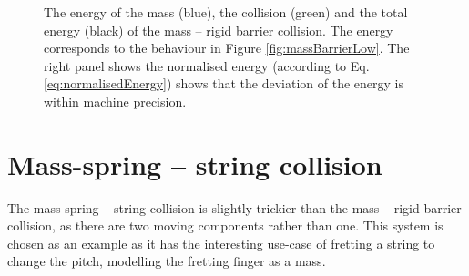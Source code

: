 \begin{figure}[h]
    \centering
      \caption{The energy of the mass (blue), the collision (green) and the total energy (black) of the mass -- rigid barrier collision. The energy corresponds to the behaviour in Figure \ref{fig:massBarrierLow}. The right panel shows the normalised energy (according to Eq. \eqref{eq:normalisedEnergy}) shows that the deviation of the energy is within machine precision. \label{fig:massBarrierEnergy}}
\end{figure}

\section{Mass-spring -- string collision}\label{sec:massString}
The mass-spring -- string collision is slightly trickier than the mass -- rigid barrier collision, as there are two moving components rather than one. This system is chosen as an example as it has the interesting use-case of fretting a string to change the pitch, modelling the fretting finger as a mass.

